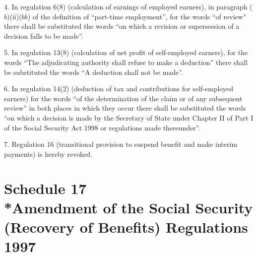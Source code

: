 \documentclass[12pt,a4paper]{article}
\begin{document}
\medskip

4.  In regulation 6(8) (calculation of earnings of employed earners), in paragraph ($b$)(ii)($bb$)  of the definition of “part-time employment”, for the words “of review” there shall be substituted the words “on which a revision or supersession of a decision falls to be made”.

\medskip

5.  In regulation 13(8) (calculation of net profit of self-employed earners), for the words “The adjudicating authority shall refuse to make a deduction” there shall be substituted the words “A deduction shall not be made”.

\medskip

6.  In regulation 14(2) (deduction of tax and contributions for self-employed earners) for the words “of the determination of the claim or of any subsequent review” in both places in which they occur there shall be substituted the words “on which a decision is made by the Secretary of State under Chapter II of Part I of the Social Security Act 1998 or regulations made thereunder”.

\medskip

7.  Regulation 16 (transitional provision to suspend benefit and make interim payments) is hereby revoked.

\part[Schedule 17 --- Amendment of the Social Security (Recovery of Benefits) Regulations 1997]{Schedule 17\\*Amendment of the Social Security (Recovery of Benefits) Regulations 1997}

\renewcommand\parthead{--- Schedule 17}
\end{document}
